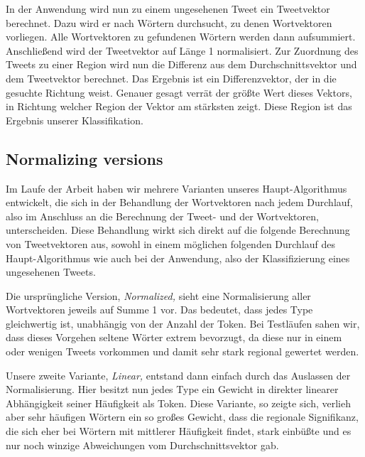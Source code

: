 \documentclass[../Main.tex]{subfiles}
\begin{document}
In der Anwendung wird nun zu einem ungesehenen Tweet ein Tweetvektor berechnet. Dazu wird er nach Wörtern durchsucht, zu denen Wortvektoren vorliegen. Alle Wortvektoren zu gefundenen Wörtern werden dann aufsummiert.
Anschließend wird der Tweetvektor auf Länge 1 normalisiert. Zur Zuordnung des Tweets zu einer Region wird nun die Differenz aus dem Durchschnittsvektor und dem Tweetvektor berechnet. Das Ergebnis ist ein Differenzvektor, der in die gesuchte Richtung weist. Genauer gesagt verrät der größte Wert dieses Vektors, in Richtung welcher Region der Vektor am stärksten zeigt. Diese Region ist das Ergebnis unserer Klassifikation.

\subsection{Normalizing versions}
Im Laufe der Arbeit haben wir mehrere Varianten unseres Haupt-Algorithmus entwickelt, die sich in der Behandlung der Wortvektoren nach jedem Durchlauf, also im Anschluss an die Berechnung der Tweet- und der Wortvektoren, unterscheiden. Diese Behandlung wirkt sich direkt auf die folgende Berechnung von Tweetvektoren aus, sowohl in einem möglichen folgenden Durchlauf des Haupt-Algorithmus wie auch bei der Anwendung, also der Klassifizierung eines ungesehenen Tweets.

Die ursprüngliche Version, \textit{Normalized,} sieht eine Normalisierung aller Wortvektoren jeweils auf Summe 1 vor. Das bedeutet, dass jedes Type gleichwertig ist, unabhängig von der Anzahl der Token. Bei Testläufen sahen wir, dass dieses Vorgehen seltene Wörter extrem bevorzugt, da diese nur in einem oder wenigen Tweets vorkommen und damit sehr stark regional gewertet werden.

Unsere zweite Variante, \textit{Linear,} entstand dann einfach durch das Auslassen der Normalisierung. Hier besitzt nun jedes Type ein Gewicht in direkter linearer Abhängigkeit seiner Häufigkeit als Token. Diese Variante, so zeigte sich, verlieh aber sehr häufigen Wörtern ein so großes Gewicht, dass die regionale Signifikanz, die sich eher bei Wörtern mit mittlerer Häufigkeit findet, stark einbüßte und es nur noch winzige Abweichungen vom Durchschnittsvektor gab.
\end{document}
